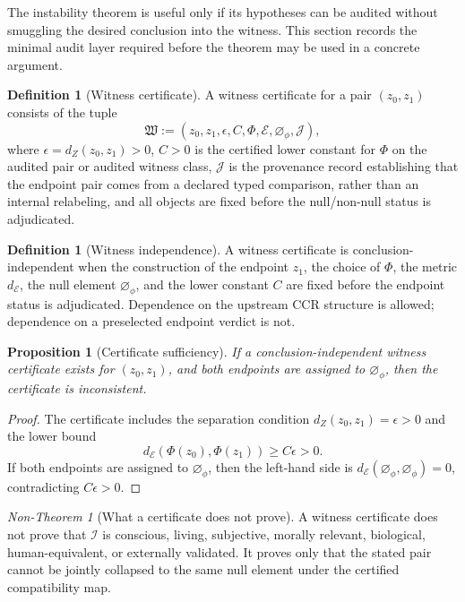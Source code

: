 \documentclass[11pt,a4paper]{article}
\theoremstyle{plain}
\newtheorem{proposition}[theorem]{Proposition}
\theoremstyle{definition}
\newtheorem{definition}[theorem]{Definition}
\theoremstyle{remark}
\newtheorem{nontheorem}[theorem]{Non-Theorem}
\newcommand{\I}{\mathcal{I}}
\newcommand{\E}{\mathcal{E}}
\newcommand{\dE}{d_{\mathcal{E}}}
\newcommand{\nullphi}{\varnothing_\phi}
\begin{document}
The instability theorem is useful only if its hypotheses can be audited without smuggling the desired conclusion into the witness. This section records the minimal audit layer required before the theorem may be used in a concrete argument.

\begin{definition}[Witness certificate]\label{def:witness-certificate}
A witness certificate for a pair $(z_0,z_1)$ consists of the tuple
\[
\mathfrak{W}:=(z_0,z_1,\epsilon,C,\Phi,\E,\nullphi,\mathcal{J}),
\]
where $\epsilon=d_Z(z_0,z_1)>0$, $C>0$ is the certified lower constant for $\Phi$ on the audited pair or audited witness class, $\mathcal{J}$ is the provenance record establishing that the endpoint pair comes from a declared typed comparison, rather than an internal relabeling, and all objects are fixed before the null/non-null status is adjudicated.
\end{definition}

\begin{definition}[Witness independence]
A witness certificate is conclusion-independent when the construction of the endpoint $z_1$, the choice of $\Phi$, the metric $\dE$, the null element $\nullphi$, and the lower constant $C$ are fixed before the endpoint status is adjudicated. Dependence on the upstream CCR structure is allowed; dependence on a preselected endpoint verdict is not.
\end{definition}

\begin{proposition}[Certificate sufficiency]
If a conclusion-independent witness certificate exists for $(z_0,z_1)$, and both endpoints are assigned to $\nullphi$, then the certificate is inconsistent.
\end{proposition}

\begin{proof}
The certificate includes the separation condition $d_Z(z_0,z_1)=\epsilon>0$ and the lower bound
\[
\dE(\Phi(z_0),\Phi(z_1))\geq C\epsilon>0.
\]
If both endpoints are assigned to $\nullphi$, then the left-hand side is $\dE(\nullphi,\nullphi)=0$, contradicting $C\epsilon>0$.
\end{proof}

\begin{nontheorem}[What a certificate does not prove]
A witness certificate does not prove that $\I$ is conscious, living, subjective, morally relevant, biological, human-equivalent, or externally validated. It proves only that the stated pair cannot be jointly collapsed to the same null element under the certified compatibility map.
\end{nontheorem}
\end{document}
